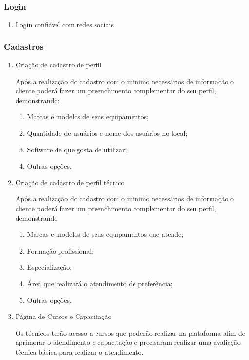 \documentclass[
    12pt,               %
    openright,          %
    oneside,
    a4paper,            %
    MODELO,             %
    english,            %
    brazil              %
   ]{ifsp-spo-inf-ctds}
\begin{document}
\subsubsection{Login}

\begin{enumerate}
	\item Login confiável com redes sociais
\end{enumerate}

\subsubsection{Cadastros}

\begin{enumerate}
	\item Criação de cadastro de perfil
	
	Após a realização do cadastro com o mínimo necessários de informação o cliente poderá fazer um preenchimento complementar do seu perfil, demonstrando:
	
		\begin{enumerate}
		\item Marcas e modelos de seus equipamentos;
		\item Quantidade de usuários e nome dos usuários no local;
		\item Software de que gosta de utilizar;
		\item Outras opções.
		\end{enumerate}
	
	\item Criação de cadastro de perfil técnico
	
	Após a realização do cadastro com o mínimo necessários de informação o cliente poderá fazer um preenchimento complementar do seu perfil, demonstrando
	
		\begin{enumerate}
			
			\item Marcas e modelos de seus equipamentos que atende;
			\item Formação profissional;
			\item Especialização;
			\item Área que realizará o atendimento de preferência;
			\item Outras opções. 
			
		\end{enumerate}
	
	\item Página de Cursos e Capacitação
	
		Os técnicos terão acesso a cursos que poderão realizar na plataforma afim de aprimorar o atendimento e capacitação e precisaram realizar uma avaliação técnica básica para realizar o atendimento.
	
\end{enumerate}
\end{document}
